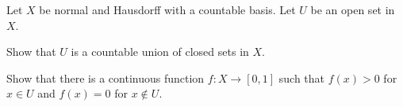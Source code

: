 Let $X$ be normal and Hausdorff with a countable basis. Let $U$ be an
open set in $X$. 
\begin{alist}
\item Show that $U$ is a countable union of closed sets in
$X$.
\item Show that there is a continuous function $f:X\rightarrow [0,1]$
such that $f(x)>0$ for $x\in U$ and $f(x)=0$ for $x\notin U$.

\end{alist}
